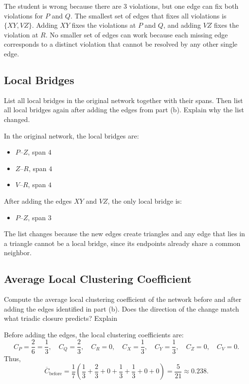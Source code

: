 \documentclass{assignment}
\begin{document}
The student is wrong because there are 3 violations, but one edge can fix both violations for $P$ and $Q$. The smallest set of edges that fixes all violations is $\{XY, VZ\}$. Adding $XY$ fixes the violations at $P$ and $Q$, and adding $VZ$ fixes the violation at $R$. No smaller set of edges can work because each missing edge corresponds to a distinct violation that cannot be resolved by any other single edge.

\subsection{Local Bridges}
\begin{problem}
List all local bridges in the original network together with their spans. Then list all local bridges again after adding the edges from part (b). Explain why the list changed.
\end{problem}

In the original network, the local bridges are:

\begin{itemize}
    \item $P$--$Z$, span $4$
    \item $Z$--$R$, span $4$
    \item $V$--$R$, span $4$
\end{itemize}

After adding the edges $XY$ and $VZ$, the only local bridge is:

\begin{itemize}
    \item $P$--$Z$, span $3$
\end{itemize}

The list changes because the new edges create triangles and any edge that lies in a triangle cannot be a local bridge, since its endpoints already share a common neighbor.

\subsection{Average Local Clustering Coefficient}
\begin{problem}
Compute the average local clustering coefficient of the network before and after adding the edges identified in part (b). Does the direction of the change match what triadic closure predicts? Explain
\end{problem}

Before adding the edges, the local clustering coefficients are:
\[
    C_P = \frac{2}{6} = \frac{1}{3}, \quad
    C_Q = \frac{2}{3}, \quad
    C_R = 0, \quad
    C_X = \frac{1}{3}, \quad
    C_Y = \frac{1}{3}, \quad
    C_Z = 0, \quad
    C_V = 0.
\]
Thus,
\[
    \overline{C}_{\text{before}} = \frac{1}{7}\left(\frac{1}{3}+\frac{2}{3}+0+\frac{1}{3}+\frac{1}{3}+0+0\right)
    = \frac{5}{21} \approx 0.238.
\]
\end{document}
